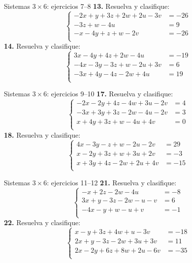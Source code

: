 \documentclass[aspectratio=169,9pt]{beamer}
\theoremstyle{remark}
\begin{document}
\begin{frame}{Sistemas $3\times 6$: ejercicios 7--8}
\scriptsize
\textbf{13.} Resuelva y clasifique:
\[\left\{\begin{aligned}
-2x+y+3z+2w+2u-3v&=-26\\
-3z+w-4u&=9\\
-x-4y+z+w-2v&=-26\\
\end{aligned}\right.\]
\textbf{14.} Resuelva y clasifique:
\[\left\{\begin{aligned}
3x-4y+4z+2w-4u&=-19\\
-4x-3y-3z+w-2u+3v&=6\\
-3x+4y-4z-2w+4u&=19\\
\end{aligned}\right.\]
\end{frame}
\begin{frame}{Sistemas $3\times 6$: ejercicios 9--10}
\scriptsize
\textbf{17.} Resuelva y clasifique:
\[\left\{\begin{aligned}
-2x-2y+4z-4w+3u-2v&=4\\
-3x+3y+3z-2w-4u-2v&=3\\
x+4y+3z+w-4u+4v&=0\\
\end{aligned}\right.\]
\textbf{18.} Resuelva y clasifique:
\[\left\{\begin{aligned}
4x-3y-z+w-2u-2v&=29\\
x-2y+3z+w+3u+2v&=-3\\
x+3y+4z-2w+2u+4v&=-15\\
\end{aligned}\right.\]
\end{frame}
\begin{frame}{Sistemas $3\times 6$: ejercicios 11--12}
\scriptsize
\textbf{21.} Resuelva y clasifique:
\[\left\{\begin{aligned}
-x+2z-2w-4u&=-8\\
3x+y-3z-2w-u-v&=6\\
-4x-y+w-u+v&=-1\\
\end{aligned}\right.\]
\textbf{22.} Resuelva y clasifique:
\[\left\{\begin{aligned}
x-y+3z+4w+u-3v&=-18\\
2x+y-3z-2w+3u+3v&=11\\
2x-2y+6z+8w+2u-6v&=-35\\
\end{aligned}\right.\]
\end{frame}
\end{document}
